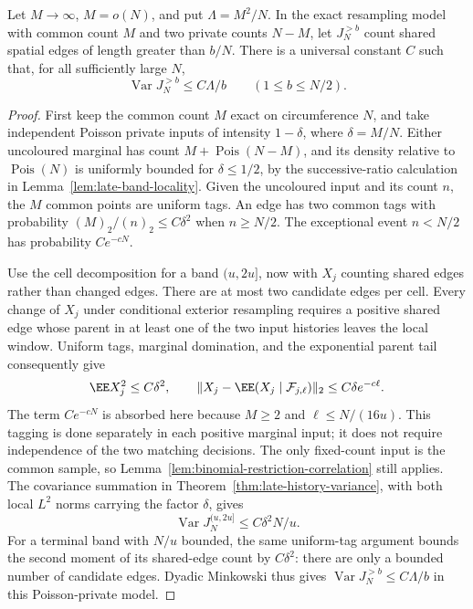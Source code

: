 \documentclass[11pt,letterpaper]{article}
\begin{document}
\begin{lemma}
\label{lem:tagged-shared-tail}
Let $M\to\infty$, $M=o(N)$, and put $\Lambda=M^2/N$.
In the exact resampling model with common count $M$ and
two private counts $N-M$, let $J_N^{>b}$ count shared spatial
edges of length greater than $b/N$. There is a universal
constant $C$ such that, for all sufficiently large $N$,
\begin{equation}\label{eq:tagged-shared-tail}
 \operatorname{Var}J_N^{>b}\le C\Lambda/b
                                  \qquad(1\le b\le N/2).
\end{equation}
\end{lemma}
\begin{proof}
First keep the common count $M$ exact on circumference $N$,
and take independent Poisson private inputs of intensity
$1-\delta$, where $\delta=M/N$.
Either uncoloured marginal has count
$M+\operatorname{Pois}(N-M)$, and its density relative to
$\operatorname{Pois}(N)$ is uniformly bounded for $\delta\le1/2$,
by the successive-ratio calculation in
Lemma~\ref{lem:late-band-locality}.
Given the uncoloured input and its count $n$, the $M$ common
points are uniform tags. An edge has two common tags with
probability $(M)_2/(n)_2\le C\delta^2$ when $n\ge N/2$.
The exceptional event $n<N/2$ has probability $Ce^{-cN}$.

Use the cell decomposition for a band $(u,2u]$, now with
$X_j$ counting shared edges rather than changed edges.
There are at most two candidate edges per cell.
Every change of $X_j$ under conditional exterior resampling
requires a positive shared edge whose parent in at least
one of the two input histories leaves the local window.
Uniform tags, marginal domination, and the exponential
parent tail consequently give
\[
 \EE X_j^2\le C\delta^2,\qquad
 \|X_j-\EE(X_j\mid\mathcal F_{j,\ell})\|_2
                \le C\delta e^{-c\ell}.
\]
The term $Ce^{-cN}$ is absorbed here because $M\ge2$ and
$\ell\le N/(16u)$. This tagging is done separately in each
positive marginal input; it does not require independence
of the two matching decisions.
The only fixed-count input is the common sample, so
Lemma~\ref{lem:binomial-restriction-correlation} still applies.
The covariance summation in
Theorem~\ref{thm:late-history-variance}, with both local
$L^2$ norms carrying the factor $\delta$, gives
\[
 \operatorname{Var}J_N^{(u,2u]}\le C\delta^2N/u.
\]
For a terminal band with $N/u$ bounded, the same uniform-tag
argument bounds the second moment of its shared-edge count
by $C\delta^2$: there are only a bounded number of candidate
edges. Dyadic Minkowski thus gives
$\operatorname{Var}J_N^{>b}\le C\Lambda/b$
in this Poisson-private model.


\end{proof}
\end{document}
